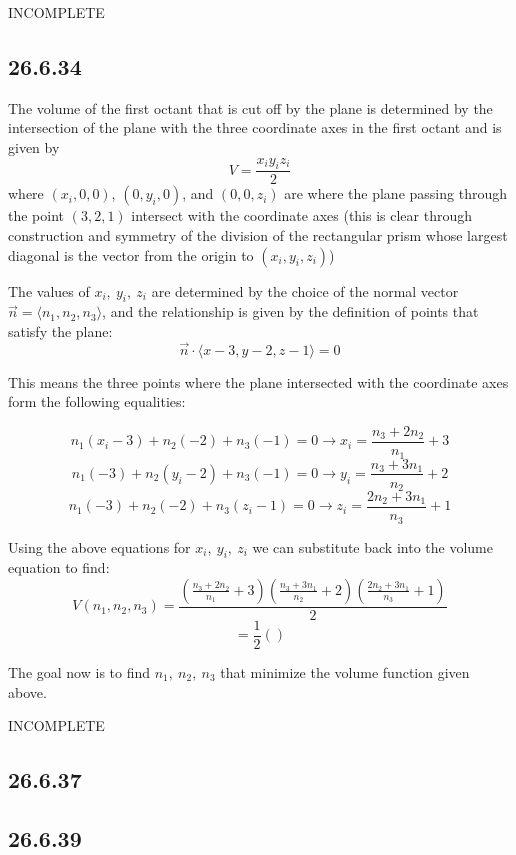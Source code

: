 \documentclass{article}
\begin{document}
INCOMPLETE

\subsection{26.6.34}

The volume of the first octant that is cut off by the plane is determined by the intersection of the plane with the three coordinate axes in the first octant and is given by $$V = \frac{x_iy_iz_i}{2}$$ where $(x_i,0,0)$, $(0,y_i,0)$, and $(0,0,z_i)$ are where the plane passing through the point $(3,2,1)$ intersect with the coordinate axes (this is clear through construction and symmetry of the division of the rectangular prism whose largest diagonal is the vector from the origin to $(x_i,y_i,z_i)$)

The values of $x_i,~y_i,~z_i$ are determined by the choice of the normal vector $\vec{n} = \langle n_1, n_2 ,n_3 \rangle$, and the relationship is given by the definition of points that satisfy the plane:
$$\vec{n}\cdot \langle x-3, y-2 ,z-1 \rangle = 0$$

This means the three points where the plane intersected with the coordinate axes form the following equalities:

$$n_1(x_i-3)+n_2(-2)+n_3(-1) = 0 \to x_i = \frac{n_3+2n_2}{n_1}+3$$
$$n_1(-3)+n_2(y_i-2)+n_3(-1) = 0 \to y_i = \frac{n_3+3n_1}{n_2}+2$$
$$n_1(-3)+n_2(-2)+n_3(z_i-1) = 0 \to z_i = \frac{2n_2+3n_1}{n_3}+1$$

Using the above equations for $x_i, ~y_i,~ z_i$ we can substitute back into the volume equation to find:
$$V(n_1,n_2,n_3) = \frac{\left(\frac{n_3+2n_2}{n_1}+3\right)\left(\frac{n_3+3n_1}{n_2}+2\right)\left(\frac{2n_2+3n_1}{n_3}+1\right)}{2}$$
$$= \frac{1}{2}\left( \right)$$

The goal now is to find $n_1,~n_2,~n_3$ that minimize the volume function given above.

INCOMPLETE

\subsection{26.6.37}

\subsection{26.6.39}
\end{document}
